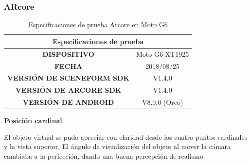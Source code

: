 \subsubsection{ARcore}
\begin{table}[H]
	\centering
	\begin{tabular}{|c|c|}
		\hline
		\multicolumn{2}{|c|}{Especificaciones de prueba}   \\ \hline
		\textbf{DISPOSITIVO}              & Moto G6 XT1925 \\ \hline
		\textbf{FECHA}                    & 2018/08/25     \\ \hline
		\textbf{VERSIÓN DE SCENEFORM SDK} & V1.4.0         \\ \hline
		\textbf{VERSIÓN DE ARCORE SDK}    & V1.4.0         \\ \hline
		\textbf{VERSIÓN DE ANDROID}       & V8.0.0 (Oreo)  \\ \hline
	\end{tabular}
	\captionsetup{justification=centering}
	\caption{Especificaciones de prueba Arcore en Moto G6}
\end{table}

\textbf{Posición cardinal} \par
El objeto virtual se pudo apreciar con claridad desde los cuatro puntos cardinales y la vista superior. El ángulo de visualización del objeto al mover la cámara cambiaba a la perfección, dando una buena percepción de realismo.

